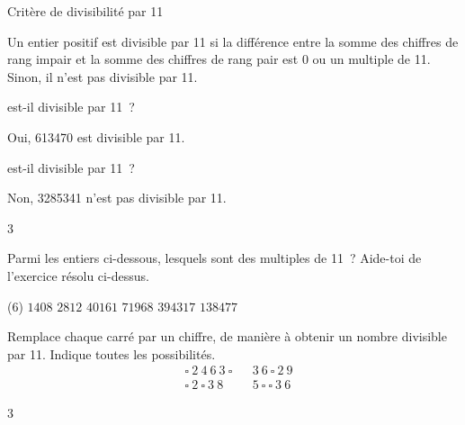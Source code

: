 \documentclass[a4paper,11pt]{report}
\begin{document}
\begin{resolu}{Critère de divisibilité par 11}{
    Un entier positif est divisible par 11 si la différence entre la somme des chiffres de rang impair et la somme des chiffres de rang pair est 0 ou un multiple de 11. Sinon, il n'est pas divisible par 11.

    \begin{tasks}
         est-il divisible par 11~? 
        
        {\color{blue}
        \begin{center} \end{center}
        \hspace*{.8cm} Oui, 613470 est divisible par 11.}
        
         est-il divisible par 11~?
        {\color{blue}
        \begin{center} \end{center}
        \hspace*{.8cm}Non, 3285341 n'est pas divisible par 11.}
        
    \end{tasks}
}{3}\end{resolu}

\begin{exo}{
\begin{tasks}
    \task Parmi les entiers ci-dessous, lesquels sont des multiples de 11~? Aide-toi de l'exercice résolu ci-dessus.
\end{tasks}
    \begin{tasks}(6)    
\task[] $1408$ 
\task[] $2812$ 
\task[] $40161$ 
\task[] $71968$ 
\task[] $394317$ 
\task[] $138477$
\end{tasks}
\begin{tasks}
	\task[b)] Remplace chaque carré par un chiffre, de manière à obtenir un nombre divisible par 11. Indique toutes les possibilités.
	    {\large
	    \begin{align*}
		    &\square~2~4~6~3~\square  && 3~6~\square~2~9\\
		    &\square~2~\square~3~8   &&5~\square~\square~3~6
\end{align*}}

\end{tasks}
}{3}\end{exo}
\end{document}
